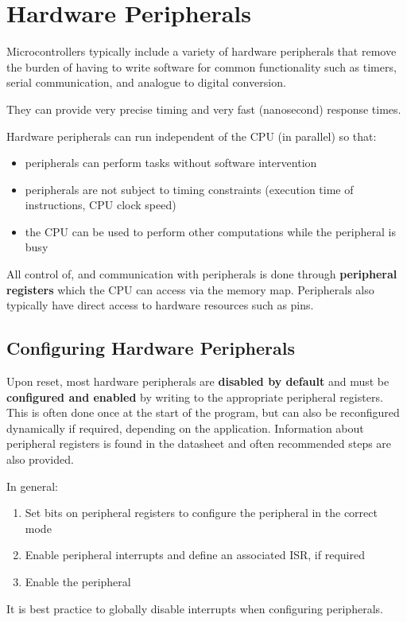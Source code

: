\documentclass{report}
\begin{document}
\chapter{Hardware Peripherals}
Microcontrollers typically include a variety of hardware peripherals
that remove the burden of having to write software for common
functionality such as timers, serial communication, and analogue to
digital conversion.

They can provide very precise timing and very fast (nanosecond)
response times.

Hardware peripherals can run independent of the CPU (in parallel) so
that:
\begin{itemize}
    \item peripherals can perform tasks without software intervention
    \item peripherals are not subject to timing constraints (execution
          time of instructions, CPU clock speed)
    \item the CPU can be used to perform other computations while the
          peripheral is busy
\end{itemize}
All control of, and communication with peripherals is done through \textbf{peripheral registers}
which the CPU can access via the memory map. Peripherals also typically have direct access
to hardware resources such as pins.
\section{Configuring Hardware Peripherals}
Upon reset, most hardware peripherals are \textbf{disabled by default}
and must be \textbf{configured and enabled} by writing to the
appropriate peripheral registers. This is often done once at the start
of the program, but can also be reconfigured dynamically if required,
depending on the application. Information about peripheral registers is
found in the datasheet and often recommended steps are also provided.

In general:
\begin{enumerate}
    \item Set bits on peripheral registers to configure the peripheral
          in the correct mode
    \item Enable peripheral interrupts and define an associated ISR, if
          required
    \item Enable the peripheral
\end{enumerate}
It is best practice to globally disable interrupts when configuring peripherals.
\end{document}
